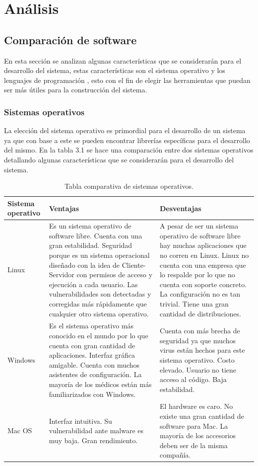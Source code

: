 \documentclass[12pt]{report}
\begin{document}
\chapter{Análisis}
\section{Comparación de software}
En esta sección se analizan algunas características que se considerarán para el desarrollo del sistema, estas características son el sistema operativo y los lenguajes de programación , esto con el fin de elegir las herramientas que puedan ser más útiles para la construcción del sistema.

\subsection{Sistemas operativos}
La elección del sistema operativo es primordial para el desarrollo de un sistema ya que con base a este se pueden encontrar librerías específicas para el desarrollo del mismo. En la tabla 3.1  se hace una comparación entre dos sistemas operativos detallando algunas características que se considerarán para el desarrollo del sistema.

\begin{table}[H]
\begin{center}
\begin{tabular}{|p{25mm}|p{60mm}|p{60mm}|}
\hline
Sistema operativo & Ventajas & Desventajas\\
\hline \hline 
Linux & Es un sistema operativo de software libre. Cuenta con una gran estabilidad. Seguridad porque es un sistema operacional diseñado con la idea de Cliente-Servidor con permisos de acceso y ejecución a cada usuario. Las vulnerabilidades son detectadas y corregidas más rápidamente que cualquier otro sistema operativo.\cite{so} & A pesar de ser un sistema operativo de software libre hay muchas aplicaciones que no corren en Linux. Linux no cuenta con una empresa que lo respalde por lo que no cuenta con soporte concreto. La configuración no es tan trivial.  Tiene una gran cantidad de distribuciones.\cite{so}\\
\hline
Windows & Es el sistema operativo más conocido en el mundo por lo que cuenta con gran cantidad de aplicaciones. Interfaz gráfica amigable. Cuenta con muchos asistentes de configuración. La mayoría de los médicos están más familiarizados con Windows.\cite{so} & Cuenta con más brecha de seguridad ya que muchos virus están hechos para este sistema operativo. Costo elevado. Usuario no tiene acceso al código. Baja estabilidad.\cite{so}\\
\hline
Mac OS & Interfaz intuitiva. Su vulnerabilidad ante malware es muy baja.  Gran rendimiento.\cite{mac} & El hardware es caro. No existe una gran cantidad de software para Mac. La mayoría de los accesorios deben ser de la misma compañía.\cite{mac}\\
\hline
\end{tabular}
\caption{Tabla comparativa de sistemas operativos.}
\end{center}
\end{table}
\end{document}
